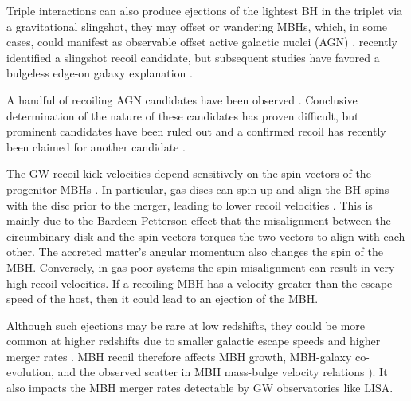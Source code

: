 \documentclass[11pt, letterpaper]{article}
\begin{document}
Triple interactions can also produce ejections of the lightest  BH in the triplet via a gravitational slingshot, they may
offset or wandering MBHs, which, in some cases, could manifest as observable offset active galactic nuclei (AGN) \citep{Madau_2004,Loeb_2007, blecha_effects_2008, barrows_spatially_2016, Blecha_2019_Astro2020}. \citet{vanDokkum2023} recently identified a slingshot recoil candidate, but subsequent studies have
favored a bulgeless edge-on galaxy explanation \citep{Sanchez2023,Sanchez2023b,Montes2024}.

A handful of  recoiling AGN candidates have been observed \citep{Komossa2008,Civano2010,Koss2014,Kalfountzou2017,Chiaberge_2017,Hogg_2021,Ward2021,vanDokkum2023,bigmac2024,Uppal_2024}. Conclusive determination of the nature of these candidates has proven difficult, but prominent candidates have been ruled out \citep{Decarli2014,Li2024} and a confirmed recoil has recently been claimed for another candidate \citep{chiaberge2025}. 


The GW recoil kick velocities depend sensitively on the spin vectors of the progenitor MBHs \citep{Gonz_lez_2007,Campanelli_2007,Brugmann_2008,Kesden_2010,Lousto_2012,Berti_2012,Gerosa_2018}. In particular, gas discs can spin up and align the BH spins with the disc prior to the merger, leading to lower recoil velocities \citep{Martin_2007,Bogdanovi__2007,Martin2009,Tremaine2014}. This is mainly due to the Bardeen-Petterson effect that the misalignment between the circumbinary disk and the spin vectors torques the two vectors to align with each other. The accreted matter's angular momentum also changes the spin of the MBH. Conversely, in gas-poor systems the spin misalignment can result in very high recoil velocities. If a recoiling MBH has a velocity greater than the escape speed of the host, then it could lead to an ejection of the MBH. 


Although such ejections may be rare at low redshifts, they could be more common at higher redshifts due to smaller galactic escape speeds and higher merger rates \citep{volonteri_assembly_2003,Blecha2016}. MBH recoil therefore affects MBH growth, MBH-galaxy co-evolution, and the observed scatter in MBH mass-bulge velocity relations \citep{Volonteri_2007,gualandris_ejection_2008,blecha_recoiling_2011}). It also impacts the MBH merger rates detectable by GW observatories like LISA.

\end{document}
